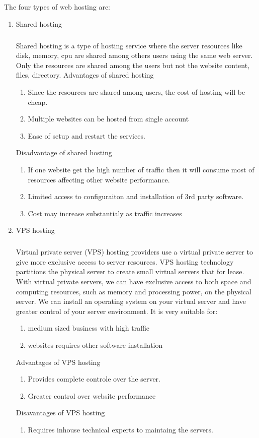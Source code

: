\documentclass[11pt]{article}
\begin{document}
The four types of web hosting are:
\begin{enumerate}

    \item Shared hosting
        \subparagraph{}
        Shared hosting is a type of hosting service where the server resources like disk, memory, cpu are shared among others users using the same web server. Only the resources are shared among the users but not the website content, files, directory. 
        \subitem Advantages of shared hosting
        \begin{enumerate}
            \item Since the resources are shared among users, the cost of hosting will be cheap.
            \item Multiple websites can be hosted from single account
            \item Ease of setup and restart the services.
        \end{enumerate}

        \subitem Disadvantage of shared hosting
        \begin{enumerate}
            \item If one website get the high number of traffic then it will consume most of resources affecting other website performance.
            \item Limited access to configuraiton and installation of 3rd party software.
            \item Cost may increase substantialy as traffic increases
        \end{enumerate}

    \item VPS hosting
    \subparagraph{}
    Virtual private server (VPS) hosting providers use a virtual private server to give more exclusive access to server resources. VPS hosting technology partitions the physical server to create small virtual servers that for lease. With virtual private servers, we can have exclusive access to both space and computing resources, such as memory and processing power, on the physical server. We can install an operating system on your virtual server and have greater control of your server environment.
    It is very suitable for: 
    \begin{enumerate}
        \item medium sized business with high traffic
        \item websites requires other software installation
    \end{enumerate}
    \subitem Advantages of VPS hosting
    \begin{enumerate}
        \item Provides complete controle over the server.
        \item Greater control over website performance
    \end{enumerate}
    \subitem Disavantages of VPS hosting
    \begin{enumerate}
        \item Requires inhouse technical experts to maintaing the servers.
    \end{enumerate}


\end{enumerate}
\end{document}
